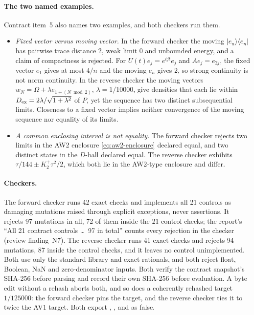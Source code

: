 \paragraph{The two named examples.}
Contract item~5 also names two examples, and both checkers run them.
\begin{itemize}
\item \emph{Fixed vector versus moving vector.} In the forward checker the
 moving $|e_n\rangle\langle e_n|$ has pairwise trace distance 2, weak limit 0
 and unbounded energy, and a claim of compactness is rejected. For
 $U(t)e_j=e^{ijt}e_j$ and $Ae_j=e_{2j}$, the fixed vector $e_1$ gives at most
 $4/n$ and the moving $e_n$ gives 2, so strong continuity is not norm
 continuity. In the reverse checker the moving vectors
 $w_N=\Omega+\lambda e_{1+(N\bmod2)}$, $\lambda=1/10000$, give densities that
 each lie within $D_{\rm ex}=2\lambda/\sqrt{1+\lambda^2}$ of $P$, yet the
 sequence has two distinct subsequential limits. Closeness to a fixed vector
 implies neither convergence of the moving sequence nor equality of its
 limits.
\item \emph{A common enclosing interval is not equality.} The forward checker
 rejects two limits in the AW2 enclosure \eqref{eq:aw2-enclosure} declared
 equal, and two distinct states in the $D$-ball declared equal. The reverse
 checker exhibits $\tau/144\pm K_2^+\tau^2/2$, which both lie in the AW2-type
 enclosure and differ.
\end{itemize}

\paragraph{Checkers.}
The forward checker runs 42 exact checks and implements all 21 controls as
damaging mutations raised through explicit exceptions, never assertions. It
rejects 97 mutations in all, 72 of them inside the 21 control checks; the
report's ``All 21 contract controls \ldots\ 97 in total'' counts every
rejection in the checker (review finding~N7). The reverse checker runs 41
exact checks and rejects 94 mutations, 87 inside the control checks, and it
leaves no control unimplemented. Both use only the standard library and exact
rationals, and both reject float, Boolean, NaN and zero-denominator inputs.
Both verify the contract snapshot's SHA-256 before parsing and record their
own SHA-256 before evaluation. A byte edit without a rehash aborts both, and
so does a coherently rehashed target $1/125000$: the forward checker pins the
target, and the reverse checker ties it to twice the AV1 target. Both export
, ,
 and 
as false.

